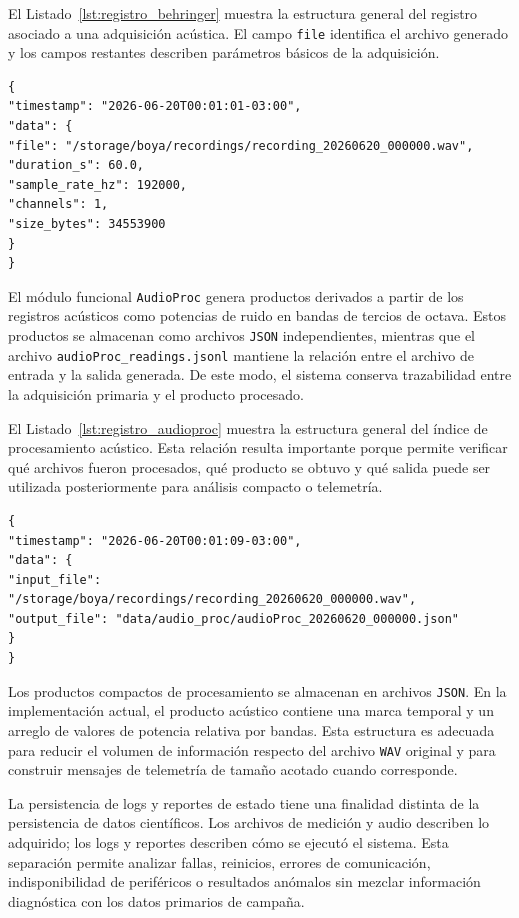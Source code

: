 El Listado~\ref{lst:registro_behringer} muestra la estructura general del registro asociado a una adquisición acústica. El campo \texttt{file} identifica el archivo generado y los campos restantes describen parámetros básicos de la adquisición.

\begin{lstlisting}[style=pseudocodigo, caption={Registro estructurado asociado a una adquisición acústica.}, label={lst:registro_behringer}]
{
"timestamp": "2026-06-20T00:01:01-03:00",
"data": {
"file": "/storage/boya/recordings/recording_20260620_000000.wav",
"duration_s": 60.0,
"sample_rate_hz": 192000,
"channels": 1,
"size_bytes": 34553900
}
}
\end{lstlisting}

El módulo funcional \texttt{AudioProc} genera productos derivados a partir de los registros acústicos como potencias de ruido en bandas de tercios de octava. Estos productos se almacenan como archivos \texttt{JSON} independientes, mientras que el archivo \texttt{audioProc\_readings.jsonl} mantiene la relación entre el archivo de entrada y la salida generada. De este modo, el sistema conserva trazabilidad entre la adquisición primaria y el producto procesado.

El Listado~\ref{lst:registro_audioproc} muestra la estructura general del índice de procesamiento acústico. Esta relación resulta importante porque permite verificar qué archivos fueron procesados, qué producto se obtuvo y qué salida puede ser utilizada posteriormente para análisis compacto o telemetría.

\begin{lstlisting}[style=pseudocodigo, caption={Relación entre archivo acústico y producto de procesamiento.}, label={lst:registro_audioproc}]
{
"timestamp": "2026-06-20T00:01:09-03:00",
"data": {
"input_file": "/storage/boya/recordings/recording_20260620_000000.wav",
"output_file": "data/audio_proc/audioProc_20260620_000000.json"
}
}
\end{lstlisting}

Los productos compactos de procesamiento se almacenan en archivos \texttt{JSON}. En la implementación actual, el producto acústico contiene una marca temporal y un arreglo de valores de potencia relativa por bandas. Esta estructura es adecuada para reducir el volumen de información respecto del archivo \texttt{WAV} original y para construir mensajes de telemetría de tamaño acotado cuando corresponde.

La persistencia de logs y reportes de estado tiene una finalidad distinta de la persistencia de datos científicos. Los archivos de medición y audio describen lo adquirido; los logs y reportes describen cómo se ejecutó el sistema. Esta separación permite analizar fallas, reinicios, errores de comunicación, indisponibilidad de periféricos o resultados anómalos sin mezclar información diagnóstica con los datos primarios de campaña.

